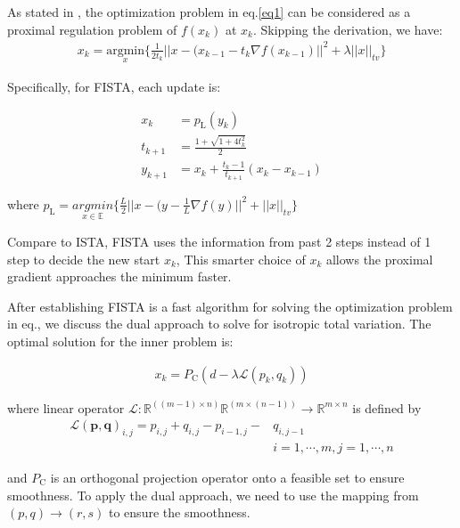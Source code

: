 \documentclass[12pt]{article}
\newcommand{\noin}{\noindent}
\begin{document}
\noin As stated in \cite{Beck2009-id}, the optimization problem in eq.\ref{eq1} can be considered as a proximal regulation problem of $f(x_k)$ at $x_k$. Skipping the derivation, we have:
\begin{align}
    x_k = \underset{x}{\mathrm{argmin}}\{\frac{1}{2t_k}||x - (x_{k-1} - t_k \nabla f(x_{k-1})||^2 + \lambda||x||_{tv}\}
\end{align}

\noin Specifically, for FISTA, each update is:

\begin{align}
    x_k &= p_{\text{L}}(y_k) \\
    t_{k+1} &= \frac{1+ \sqrt{1 + 4 t_k^2}}{2} \\
    y_{k+1} &= x_k + \frac{t_k -1}{t_{k+1}}(x_k - x_{k-1})
\end{align}

\noin where $p_{\text{L}} = \underset{x \in \mathbb{E}}{argmin}\{\frac{L}{2} ||x - (y - \frac{1}{L} \nabla f(y)||^2 + ||x||_{tv}\}$

\vspace{0.2in}
\noin Compare to ISTA, FISTA uses the information from past 2 steps instead of 1 step to decide the new start $x_k$, This smarter choice of $x_k$ allows the proximal gradient approaches the minimum faster. 

\vspace{0.2in}

\noin After establishing FISTA is a fast algorithm for solving the optimization problem in eq.\label{eq1}, we discuss the dual approach to solve for isotropic total variation. The optimal solution for the inner problem is:

\begin{align}
    x_k = P_{\text{C}}(d - \lambda \mathcal{L}(p_k,q_k))
\end{align}

where linear operator $\mathcal{L} : \mathbb{R}^{((m-1) \times n)}\mathbb{R}^{(m\times (n-1))} \rightarrow \mathbb{R}^{m \times n}$ is defined by 
\begin{align}
\mathcal{L}(\mathbf{p},\mathbf{q})_{i,j} = p_{i,j} + q_{i,j} - p_{i-1,j} - &q_{i,j-1}\\
& i = 1, \cdots, m, j = 1, \cdots, n
\end{align}

\noin and $P_{\text{C}}$ is an orthogonal projection operator onto a feasible set to ensure smoothness. To apply the dual approach, we need to use the mapping from $(p,q) \rightarrow (r,s)$ to ensure the smoothness. 
\end{document}
